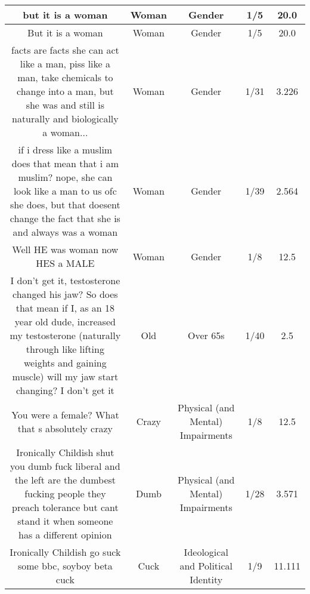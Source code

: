\documentclass[11pt]{article}
\newlength\mylength
\begin{document}
\begin{center}
\begin{longtable}{|C{.40\mylength}|C{.30\mylength}|C{.15\mylength}|C{.15\mylength}|C{.15\mylength}|}
  but it is a woman  & Woman & Gender & 1/5 & 20.0 \\  \hline
  But it is a woman  & Woman & Gender & 1/5 & 20.0 \\  \hline
  facts are facts she can act like a man, piss like a man, take chemicals to  change  into a man, but she was and still is naturally and biologically a woman...  & Woman & Gender & 1/31 & 3.226 \\  \hline
  if i dress like a muslim does that mean that i am muslim? nope, she can look like a man to us ofc she does, but that doesent change the fact that she is and always was a woman  & Woman & Gender & 1/39 & 2.564 \\  \hline
  Well HE was woman now HES a MALE  & Woman & Gender & 1/8 & 12.5 \\  \hline
  I don't get it, testosterone changed his jaw? So does that mean if I, as an 18 year old dude, increased my testosterone (naturally through like lifting weights and gaining muscle) will my jaw start changing? I don't get it  & Old & Over 65s & 1/40 & 2.5 \\  \hline
  You were a female? What that s absolutely crazy  & Crazy & Physical (and Mental) Impairments & 1/8 & 12.5 \\  \hline
  Ironically Childish shut you dumb fuck liberal and the left are the dumbest fucking people they preach tolerance but cant stand it when someone has a different opinion  & Dumb & Physical (and Mental) Impairments & 1/28 & 3.571 \\  \hline
  Ironically Childish go suck some bbc, soyboy beta cuck  & Cuck &  Ideological and Political Identity & 1/9 & 11.111 \\  \hline

\end{longtable}
\end{center}
\end{document}
